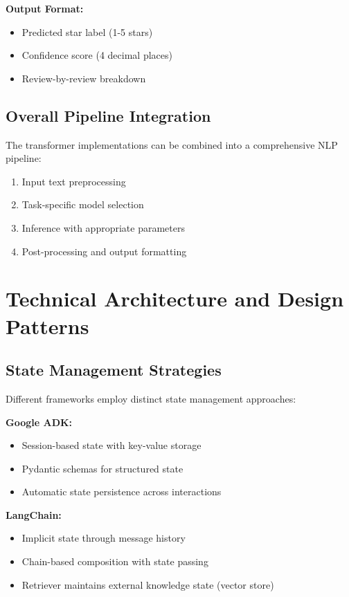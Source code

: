 \documentclass[12pt,a4paper]{article}
\begin{document}
\textbf{Output Format:}
\begin{itemize}
    \item Predicted star label (1-5 stars)
    \item Confidence score (4 decimal places)
    \item Review-by-review breakdown
\end{itemize}

\subsection{Overall Pipeline Integration}

The transformer implementations can be combined into a comprehensive NLP pipeline:
\begin{enumerate}
    \item Input text preprocessing
    \item Task-specific model selection
    \item Inference with appropriate parameters
    \item Post-processing and output formatting
\end{enumerate}

\section{Technical Architecture and Design Patterns}

\subsection{State Management Strategies}

Different frameworks employ distinct state management approaches:

\textbf{Google ADK:}
\begin{itemize}
    \item Session-based state with key-value storage
    \item Pydantic schemas for structured state
    \item Automatic state persistence across interactions
\end{itemize}

\textbf{LangChain:}
\begin{itemize}
    \item Implicit state through message history
    \item Chain-based composition with state passing
    \item Retriever maintains external knowledge state (vector store)
\end{itemize}
\end{document}
